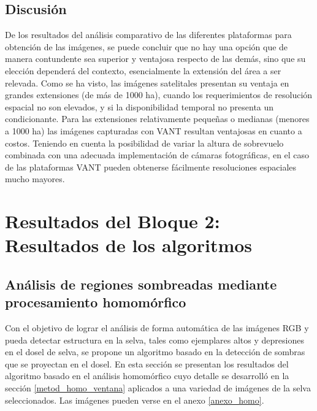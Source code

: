 \subsection{Discusión}
De los resultados del análisis comparativo de las diferentes plataformas para obtención de las imágenes, se puede concluir que no hay una opción que de manera contundente sea superior y ventajosa respecto de las demás, sino que su elección dependerá del contexto, esencialmente la extensión del área a ser relevada. Como se ha visto, las imágenes satelitales presentan su ventaja en grandes extensiones (de más de 1000 ha), cuando los requerimientos de resolución espacial no son elevados, y si la disponibilidad temporal no presenta un condicionante. Para las extensiones relativamente pequeñas o medianas (menores a 1000 ha) las imágenes capturadas con VANT resultan ventajosas en cuanto a costos. Teniendo en cuenta la posibilidad de variar la altura de sobrevuelo combinada con una adecuada implementación de cámaras fotográficas, en el caso de las plataformas VANT pueden obtenerse fácilmente resoluciones espaciales mucho mayores. 
\section{Resultados del Bloque 2: Resultados de los algoritmos}
\subsection{Análisis de regiones sombreadas mediante procesamiento homomórfico} \label{resultados homo}
Con el objetivo de lograr el análisis de forma automática de las imágenes RGB y pueda detectar estructura en la selva, tales como ejemplares altos y depresiones en el dosel de selva, se propone un algoritmo basado en la detección de sombras que se proyectan en el dosel. En esta sección se presentan los resultados del algoritmo basado en el análisis homomórfico cuyo detalle se desarrolló en la sección \ref{metod_homo_ventana} aplicados a una variedad de imágenes de la selva seleccionados. Las imágenes pueden verse en el anexo \ref{anexo_homo}.\\

